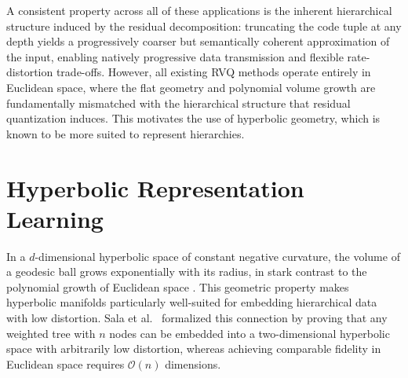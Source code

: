 \documentclass[12pt]{report}
\begin{document}
A consistent property across all of these applications is the inherent hierarchical structure induced by the residual decomposition: truncating the code tuple at any depth yields a progressively coarser but semantically coherent approximation of the input, enabling natively progressive data transmission and flexible rate-distortion trade-offs. However, all existing RVQ methods operate entirely in Euclidean space, where the flat geometry and polynomial volume growth are fundamentally mismatched with the hierarchical structure that residual quantization induces.
This motivates the use of hyperbolic geometry, which is known to be more suited to represent hierarchies. 

\section{Hyperbolic Representation Learning}
\label{sec:hyperbolic_repr}

 In a $d$-dimensional hyperbolic space of constant negative curvature, the volume of a geodesic ball grows exponentially with its radius, in stark contrast to the polynomial growth of Euclidean space \cite{cannon1997hyperbolic}. This geometric property makes hyperbolic manifolds particularly well-suited for embedding hierarchical data with low distortion. Sala et al.\ \cite{sala2018representation} formalized this connection by proving that any weighted tree with $n$ nodes can be embedded into a two-dimensional hyperbolic space with arbitrarily low distortion, whereas achieving comparable fidelity in Euclidean space requires $\mathcal{O}(n)$ dimensions.
\end{document}

